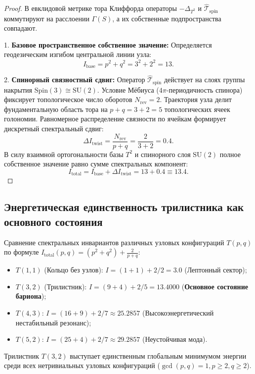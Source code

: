 \documentclass[11pt,a4paper]{article}
\theoremstyle{definition}
\theoremstyle{remark}
\begin{document}
\begin{proof}
В евклидовой метрике тора Клиффорда операторы $-\Delta_{T^2}$ и $\hat{\mathcal{T}}_{\mathrm{spin}}$ коммутируют на расслоении $\Gamma(S)$, а их собственные подпространства совпадают.

1. \textbf{Базовое пространственное собственное значение:}
Определяется геодезическим изгибом центральной линии узла:
\begin{equation}
    I_{\mathrm{base}} = p^2 + q^2 = 3^2 + 2^2 = 13.
\end{equation}

2. \textbf{Спинорный связностный сдвиг:}
Оператор $\hat{\mathcal{T}}_{\mathrm{spin}}$ действует на слоях группы накрытия $\mathrm{Spin}(3) \cong \mathrm{SU}(2)$. Условие Мёбиуса ($4\pi$-периодичность спинора) фиксирует топологическое число оборотов $N_{\mathrm{rev}} = 2$. Траектория узла делит фундаментальную область тора на $p + q = 3 + 2 = 5$ топологических ячеек голономии. Равномерное распределение связности по ячейкам формирует дискретный спектральный сдвиг:
\begin{equation}
    \Delta I_{\mathrm{twist}} = \frac{N_{\mathrm{rev}}}{p + q} = \frac{2}{3 + 2} = \mathbf{0.4}.
\end{equation}
В силу взаимной ортогональности базы $T^2$ и спинорного слоя $\mathrm{SU}(2)$ полное собственное значение равно сумме спектральных компонент:
\begin{equation}
    I_{\mathrm{total}} = I_{\mathrm{base}} + \Delta I_{\mathrm{twist}} = 13 + 0.4 \equiv \mathbf{13.4}.
\end{equation}
\end{proof}

\subsection{Энергетическая единственность трилистника как основного состояния}
Сравнение спектральных инвариантов различных узловых конфигураций $T(p,q)$ по формуле $I_{\mathrm{total}}(p,q) = (p^2 + q^2) + \frac{2}{p+q}$:
\begin{itemize}
    \item $T(1,1)$ (Кольцо без узлов): $I = (1+1) + 2/2 = 3.0$ (Лептонный сектор);
    \item $T(3,2)$ (Трилистник): $I = (9+4) + 2/5 = \mathbf{13.4000}$ (\textbf{Основное состояние бариона});
    \item $T(4,3)$: $I = (16+9) + 2/7 \approx 25.2857$ (Высокоэнергетический нестабильный резонанс);
    \item $T(5,2)$: $I = (25+4) + 2/7 \approx 29.2857$ (Неустойчивая мода).
\end{itemize}
Трилистник $T(3,2)$ выступает единственным глобальным минимумом энергии среди всех нетривиальных узловых конфигураций ($\gcd(p,q)=1, p \ge 2, q \ge 2$).
\end{document}
